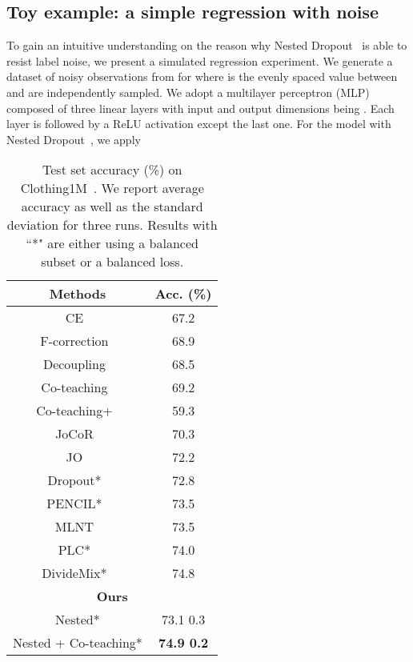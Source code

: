 \documentclass[final]{cvpr}
\begin{document}
\subsection{Toy example: a simple regression with noise}
\label{sec:toy}
To gain an intuitive understanding on the reason why Nested Dropout~\cite{rippel2014learning} is able to resist label noise, we present a simulated regression experiment. 
We generate a dataset of noisy observations from  for  where  is the evenly spaced value between  and  are independently sampled. 
We adopt a multilayer perceptron (MLP) composed of three linear layers with input and output dimensions being .
Each layer is followed by a ReLU activation except the last one. 
For the model with Nested Dropout~\cite{rippel2014learning}, we apply
\begin{table}[h]
\caption{Test set accuracy (\%) on Clothing1M~\cite{xiao2015learning}. We report average accuracy as well as the standard deviation for three runs. Results with ``*" are either using a balanced subset or a balanced loss.}
\vspace{-5mm}
\label{tab::clothing1m}
\begin{center}
\begin{tabular}{c|c}
\hline \hline
Methods  & Acc. (\%)   \\ \hline
CE~\cite{wei2020combating} & 67.2 \\ 
F-correction~\cite{wei2020combating,patrini2017making} & 68.9 \\
Decoupling~\cite{wei2020combating,malach2017decoupling} & 68.5 \\
Co-teaching~\cite{wei2020combating,han2018co} & 69.2 \\
Co-teaching+~\cite{wei2020combating,yu2019does} & 59.3 \\
JoCoR~\cite{wei2020combating} & 70.3 \\
JO~\cite{tanaka2018joint} & 72.2 \\
Dropout*~\cite{srivastava2014dropout} & 72.8\\
PENCIL*~\cite{PENCIL_CVPR_2019} & 73.5\\
MLNT~\cite{li2019learning} & 73.5 \\ 
PLC*~\cite{zhang2021learning} & 74.0\\
DivideMix*~\cite{li2020dividemix} & 74.8 \\
\hline
\multicolumn{2}{c}{\textbf{Ours}} \\
Nested* & 73.1 {} 0.3\\
Nested + Co-teaching* & \bf 74.9 {} 0.2\\
\hline \hline
\end{tabular}
\end{center}
\vspace{-5mm}
\end{table}
\end{document}
